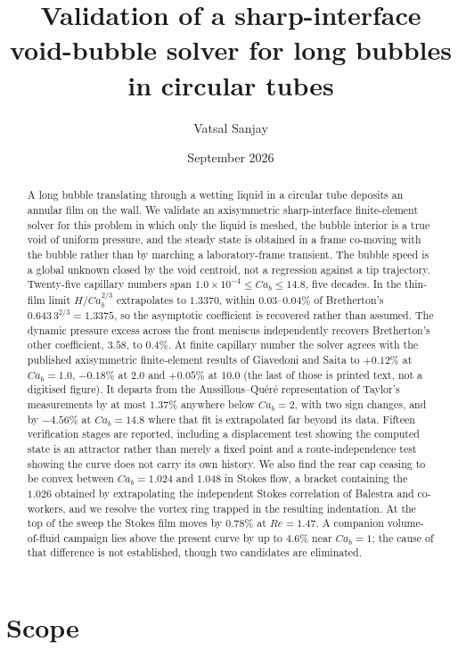 \documentclass[11pt,a4paper]{article}
\title{Validation of a sharp-interface void-bubble solver for long bubbles in
circular tubes}
\author{Vatsal Sanjay}
\date{September 2026}
\begin{document}
\maketitle

\begin{abstract}
A long bubble translating through a wetting liquid in a circular tube deposits
an annular film on the wall. We validate an axisymmetric sharp-interface
finite-element solver for this problem in which only the liquid is meshed, the
bubble interior is a true void of uniform pressure, and the steady state is
obtained in a frame co-moving with the bubble rather than by marching a
laboratory-frame transient. The bubble speed is a global unknown closed by the
void centroid, not a regression against a tip trajectory. Twenty-five
capillary numbers span $1.0\times10^{-4}\le Ca_b\le14.8$, five decades. In the
thin-film limit $H/Ca_b^{2/3}$ extrapolates to $1.3370$, within $0.03$--$0.04\%$
of Bretherton's $0.643\,3^{2/3}=1.3375$, so the asymptotic coefficient is
recovered rather than assumed. The dynamic pressure excess across the front
meniscus independently recovers Bretherton's other coefficient, $3.58$, to
$0.4\%$. At finite capillary number the solver agrees
with the published axisymmetric finite-element results of Giavedoni and Saita
to $+0.12\%$ at $Ca_b=1.0$, $-0.18\%$ at $2.0$ and $+0.05\%$ at $10.0$ (the last
of those is printed text, not a digitised figure). It
departs from the Aussillous--Qu\'er\'e representation of Taylor's measurements
by at most $1.37\%$ anywhere below $Ca_b=2$, with two sign changes, and by
$-4.56\%$ at $Ca_b=14.8$ where that fit is extrapolated far beyond its data.
Fifteen verification stages are reported, including a displacement test showing
the computed state is an attractor rather than merely a fixed point and a
route-independence test showing the curve does not carry its own history.
We also find the rear cap ceasing
to be convex between $Ca_b=1.024$ and $1.048$ in Stokes flow, a bracket
containing the $1.026$ obtained by extrapolating the independent Stokes
correlation of Balestra and co-workers, and we resolve the vortex ring trapped
in the resulting indentation. At the top of the sweep the Stokes film moves by
$0.78\%$ at $Re=1.47$. A companion volume-of-fluid campaign lies above the
present curve by up to $4.6\%$ near $Ca_b=1$; the cause of that difference is
not established, though two candidates are eliminated.
\end{abstract}

\section{Scope}
\end{document}

